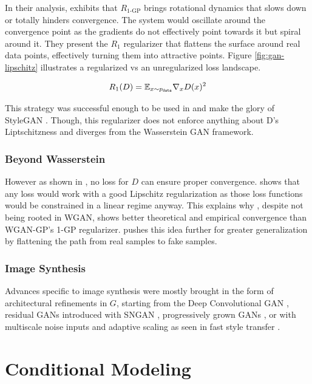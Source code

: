 In their analysis, \citet{R1}  exhibits that $R_\text{1-GP}$ brings rotational dynamics that slows down or totally hinders convergence. The system would oscillate around the convergence point as the gradients do not effectively point towards it but spiral around it. They present the $R_1$ regularizer that flattens the surface around real data points, effectively turning them into attractive points. Figure \ref{fig:gan-lipschitz} illustrates a regularized vs an unregularized loss landscape.

\begin{equation}
    R_1(D) = \mathbb{E}_{x \sim p_\texttt{data}} \nabla_x D(x)^2
\end{equation}

This strategy was successful enough to be used in and make the glory of StyleGAN \citep{stylegan}. Though, this regularizer does not enforce anything about D's Liptschitzness and diverges from the Wasserstein GAN framework.

\subsubsection{Beyond Wasserstein}

However as shown in \citet{aregansequal}, no loss for $D$ can ensure proper convergence. \citet{lipschitzgan} shows that any loss would work with a good Lipschitz regularization as those loss functions would be constrained in a linear regime anyway. This explains why \citet{R1}, despite not being rooted in \ac{WGAN}, shows better theoretical and empirical convergence than \ac{WGAN-GP}'s 1-GP regularizer. \citet{0-GP} pushes this idea further for greater generalization by flattening the path from real samples to fake samples.

\subsubsection{Image Synthesis}

Advances specific to image synthesis were mostly brought in the form of architectural refinements in $G$, starting from the Deep Convolutional GAN \citep{dcgan}, residual GANs introduced with SNGAN \citep{SNGAN}, progressively grown GANs \citep{progan}, or with multiscale noise inputs and adaptive scaling \citep{spade,stylegan,stylegan2} as seen in fast style transfer \citep{faststyletransfer}.

\section{Conditional Modeling}

